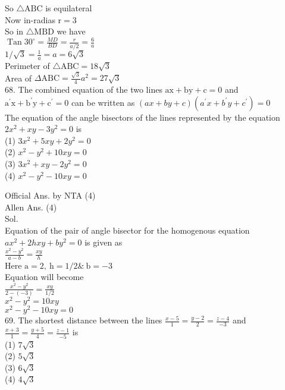 \documentclass[10pt]{article}
\begin{document}
So \(\triangle \mathrm{ABC}\) is equilateral\\
Now in-radias \(\mathrm{r}=3\)\\
So in \(\triangle \mathrm{MBD}\) we have\\
\(\operatorname{Tan} 30^{\circ}=\frac{M D}{B D}=\frac{r}{a / 2}=\frac{6}{a}\)\\
\(1 / \sqrt{3}=\frac{1}{a}=a=6 \sqrt{3}\)\\
Perimeter of \(\triangle \mathrm{ABC}=18 \sqrt{3}\)\\
Area of \(\Delta \mathrm{ABC}=\frac{\sqrt{3}}{4} a^{2}=27 \sqrt{3}\)\\
68. The combined equation of the two lines \(\mathrm{ax}+\mathrm{by}+\mathrm{c}=0\) and \(\mathrm{a}^{\prime} \mathrm{x}+\mathrm{b}^{\prime} \mathrm{y}+\mathrm{c}^{\prime}=0\) can be written as \((a x+b y+c)\left(a^{\prime} x+b^{\prime} y+c^{\prime}\right)=0\)\\
The equation of the angle bisectors of the lines represented by the equation \(2 x^{2}+x y-3 y^{2}=0\) is\\
(1) \(3 x^{2}+5 x y+2 y^{2}=0\)\\
(2) \(x^{2}-y^{2}+10 x y=0\)\\
(3) \(3 x^{2}+x y-2 y^{2}=0\)\\
(4) \(x^{2}-y^{2}-10 x y=0\)

Official Ans. by NTA (4)\\
Allen Ans. (4)\\
Sol.\\
Equation of the pair of angle bisector for the homogenous equation \(a x^{2}+2 h x y+b y^{2}=0\) is given as\\
\(\frac{x^{2}-y^{2}}{a-b}=\frac{x y}{h}\)\\
Here \(\mathrm{a}=2, \mathrm{~h}=1 / 2 \& \mathrm{~b}=-3\)\\
Equation will become\\
\(\frac{x^{2}-y^{2}}{2-(-3)}=\frac{x y}{1 / 2}\)\\
\(x^{2}-y^{2}=10 x y\)\\
\(x^{2}-y^{2}-10 x y=0\)\\
69. The shortest distance between the lines \(\frac{x-5}{1}=\frac{y-2}{2}=\frac{z-4}{-3}\) and \(\frac{x+3}{1}=\frac{y+5}{4}=\frac{z-1}{-5}\) is\\
(1) \(7 \sqrt{3}\)\\
(2) \(5 \sqrt{3}\)\\
(3) \(6 \sqrt{3}\)\\
(4) \(4 \sqrt{3}\)
\end{document}
